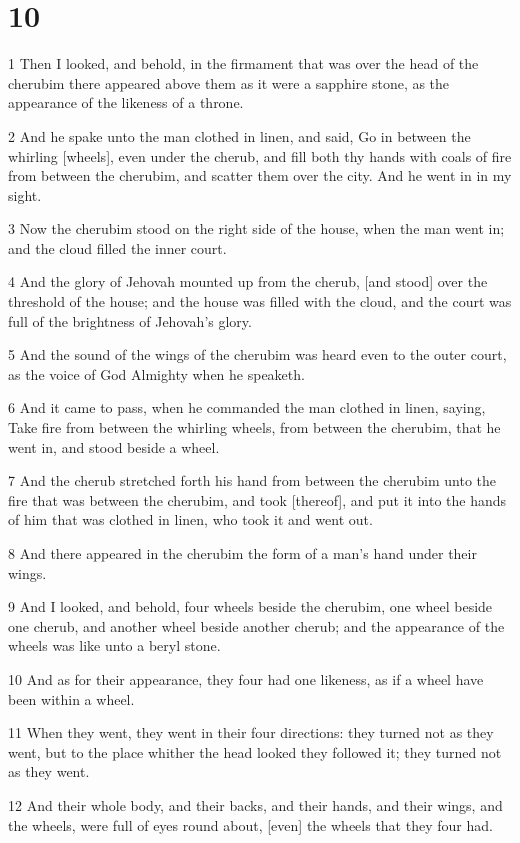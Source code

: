 \chapter{10}

\par 1 Then I looked, and behold, in the firmament that was over the head of the cherubim there appeared above them as it were a sapphire stone, as the appearance of the likeness of a throne.
\par 2 And he spake unto the man clothed in linen, and said, Go in between the whirling [wheels], even under the cherub, and fill both thy hands with coals of fire from between the cherubim, and scatter them over the city. And he went in in my sight.
\par 3 Now the cherubim stood on the right side of the house, when the man went in; and the cloud filled the inner court.
\par 4 And the glory of Jehovah mounted up from the cherub, [and stood] over the threshold of the house; and the house was filled with the cloud, and the court was full of the brightness of Jehovah's glory.
\par 5 And the sound of the wings of the cherubim was heard even to the outer court, as the voice of God Almighty when he speaketh.
\par 6 And it came to pass, when he commanded the man clothed in linen, saying, Take fire from between the whirling wheels, from between the cherubim, that he went in, and stood beside a wheel.
\par 7 And the cherub stretched forth his hand from between the cherubim unto the fire that was between the cherubim, and took [thereof], and put it into the hands of him that was clothed in linen, who took it and went out.
\par 8 And there appeared in the cherubim the form of a man's hand under their wings.
\par 9 And I looked, and behold, four wheels beside the cherubim, one wheel beside one cherub, and another wheel beside another cherub; and the appearance of the wheels was like unto a beryl stone.
\par 10 And as for their appearance, they four had one likeness, as if a wheel have been within a wheel.
\par 11 When they went, they went in their four directions: they turned not as they went, but to the place whither the head looked they followed it; they turned not as they went.
\par 12 And their whole body, and their backs, and their hands, and their wings, and the wheels, were full of eyes round about, [even] the wheels that they four had.
